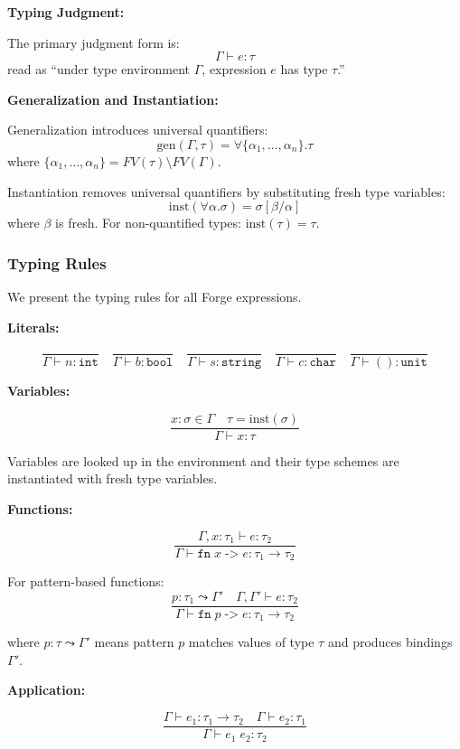 \documentclass[conference,onecolumn]{IEEEtran}
\begin{document}
\textbf{Typing Judgment:}

The primary judgment form is:
$$\Gamma \vdash e : \tau$$
read as ``under type environment $\Gamma$, expression $e$ has type $\tau$.''

\textbf{Generalization and Instantiation:}

Generalization introduces universal quantifiers:
$$\text{gen}(\Gamma, \tau) = \forall \{\alpha_1, \ldots, \alpha_n\}.\tau$$
where $\{\alpha_1, \ldots, \alpha_n\} = FV(\tau) \setminus FV(\Gamma)$.

Instantiation removes universal quantifiers by substituting fresh type variables:
$$\text{inst}(\forall \alpha.\sigma) = \sigma[\beta/\alpha]$$
where $\beta$ is fresh. For non-quantified types: $\text{inst}(\tau) = \tau$.

\subsubsection{Typing Rules}

We present the typing rules for all Forge expressions.

\textbf{Literals:}

$$\frac{}{\Gamma \vdash n : \texttt{int}}
\quad
\frac{}{\Gamma \vdash b : \texttt{bool}}
\quad
\frac{}{\Gamma \vdash s : \texttt{string}}
\quad
\frac{}{\Gamma \vdash c : \texttt{char}}
\quad
\frac{}{\Gamma \vdash () : \texttt{unit}}$$

\textbf{Variables:}

$$\frac{x : \sigma \in \Gamma \quad \tau = \text{inst}(\sigma)}{\Gamma \vdash x : \tau}$$

Variables are looked up in the environment and their type schemes are instantiated with fresh type variables.

\textbf{Functions:}

$$\frac{\Gamma, x : \tau_1 \vdash e : \tau_2}{\Gamma \vdash \texttt{fn} \; x \; \texttt{->} \; e : \tau_1 \to \tau_2}$$

For pattern-based functions:
$$\frac{p : \tau_1 \leadsto \Gamma' \quad \Gamma, \Gamma' \vdash e : \tau_2}{\Gamma \vdash \texttt{fn} \; p \; \texttt{->} \; e : \tau_1 \to \tau_2}$$

where $p : \tau \leadsto \Gamma'$ means pattern $p$ matches values of type $\tau$ and produces bindings $\Gamma'$.

\textbf{Application:}

$$\frac{\Gamma \vdash e_1 : \tau_1 \to \tau_2 \quad \Gamma \vdash e_2 : \tau_1}{\Gamma \vdash e_1 \; e_2 : \tau_2}$$
\end{document}
